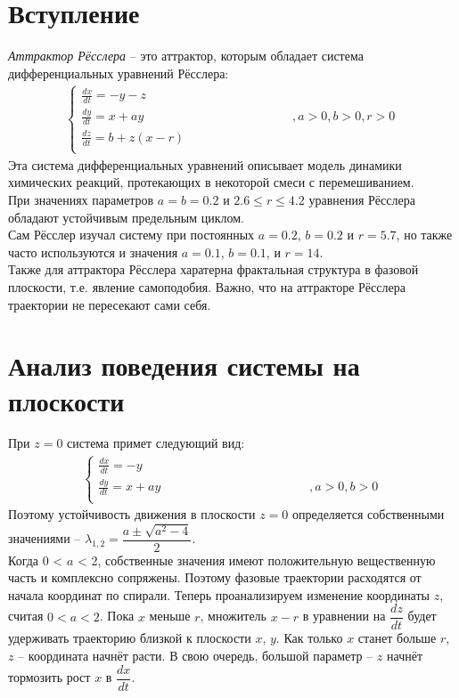 \documentclass[14pt,a4paper,fleqn]{extarticle}
\begin{document}
\section*{Вступление}
\textit{Аттрактор Рёсслера} -- это аттрактор, которым обладает система дифференциальных уравнений Рёсслера:
\begin{align*}
	\begin{cases}
		\frac{dx}{dt} = -y - z\\
		\frac{dy}{dt} = x + ay \hspace{5cm} , a > 0, b > 0, r > 0\\
		\frac{dz}{dt} = b + z(x - r)\\
	\end{cases}
\end{align*}
Эта система дифференциальных уравнений описывает модель динамики химических реакций, протекающих в некоторой смеси с перемешиванием.\\
При значениях параметров $a = b = 0.2$ и $2.6 \leq r \leq 4.2$ уравнения Рёсслера обладают устойчивым предельным циклом.\\
Сам Рёсслер изучал систему при постоянных $a = 0.2$, $b = 0.2$ и $r = 5.7$, но также часто используются и значения $a = 0.1$, $b = 0.1$, и $r = 14$.\\
Также для аттрактора Рёсслера харатерна фрактальная структура в фазовой плоскости, т.е. явление самоподобия. Важно,  что  на  аттракторе 
Рёсслера  траектории  не  пересекают  сами  себя.
\section*{Анализ поведения системы на плоскости}
При $z = 0$ система примет следующий вид:
\begin{align*}
	\begin{cases}
		\frac{dx}{dt} = -y\\
		\frac{dy}{dt} = x + ay \hspace{5cm} , a > 0, b > 0\\
	\end{cases}
\end{align*}
Поэтому устойчивость движения в плоскости $z = 0$ определяется собственными значениями -- $\lambda_{1,2} = \dfrac{a \pm \sqrt{a^2-4}}{2}$.\\
Когда 0 < $a$ < 2, собственные значения имеют положительную вещественную часть и комплексно сопряжены. Поэтому фазовые траектории расходятся от начала координат по спирали.
\newpage
Теперь проанализируем изменение координаты $z$, считая $0 < a < 2$. Пока $x$ меньше $r$, множитель $x - r$ в уравнении на $\dfrac{dz}{dt}$ будет удерживать траекторию близкой к плоскости $x$, $y$. Как только $x$ станет больше $r$, $z$ -- координата начнёт расти. В свою очередь, большой параметр -- $z$ начнёт тормозить рост $x$ в $\dfrac{dx}{dt}$.
\end{document}
